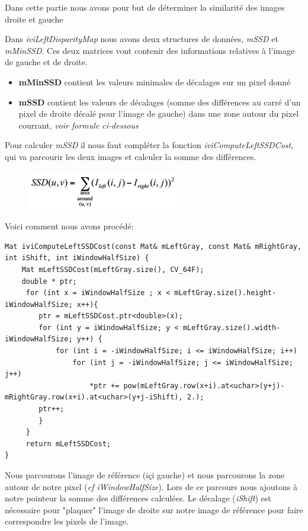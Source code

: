 \documentclass[a4paper,12pt]{report}
\begin{document}
Dans cette partie nous avons pour but de déterminer la similarité des images droite et gauche

Dans \textit{iviLeftDisparityMap} nous avons deux structures de données, \textit{mSSD} et \textit{mMinSSD}. Ces deux matrices vont contenir des informations relatives à l'image de gauche et de droite.

\begin{itemize}
	\item \textbf{mMinSSD} contient les valeurs minimales de décalages sur un pixel donné
	\item \textbf{mSSD} contient les valeurs de décalages (somme des différences au carré d'un pixel de droite décalé pour l'image de gauche) dans une zone autour du pixel courrant, \textit{voir formule ci-dessous}
\end{itemize}

Pour calculer \textit{mSSD} il nous faut compléter la fonction \textit{iviComputeLeftSSDCost}, qui va parcourir les deux images et calculer la somme des différences.

\begin{figure}[!ht]
	\center
	\includegraphics[scale=0.8]{./image/ssdEqua.png}
\end{figure}


Voici comment nous avons procédé:
\begin{lstlisting}[style=C++]
Mat iviComputeLeftSSDCost(const Mat& mLeftGray, const Mat& mRightGray, int iShift, int iWindowHalfSize) {
    Mat mLeftSSDCost(mLeftGray.size(), CV_64F);
    double * ptr;
     for (int x = iWindowHalfSize ; x < mLeftGray.size().height-iWindowHalfSize; x++){
        ptr = mLeftSSDCost.ptr<double>(x);
        for (int y = iWindowHalfSize; y < mLeftGray.size().width-iWindowHalfSize; y++) {
            for (int i = -iWindowHalfSize; i <= iWindowHalfSize; i++)
                for (int j = -iWindowHalfSize; j <= iWindowHalfSize; j++)
                    *ptr += pow(mLeftGray.row(x+i).at<uchar>(y+j)- mRightGray.row(x+i).at<uchar>(y+j-iShift), 2.);
        ptr++;
        }
     }
     return mLeftSSDCost;
}
\end{lstlisting}

Nous parcourons l'image de référence (içi gauche) et nous parcourons la zone autour de notre pixel (\textit{cf iWindowHalfSize}). Lors de ce parcours nous ajoutons à notre pointeur la somme des différences calculées. Le décalage (\textit{iShift}) est nécessaire pour "plaquer" l'image de droite sur notre image de référence pour faire correspondre les pixels de l'image. 
\end{document}
